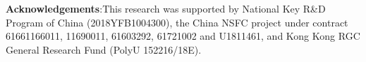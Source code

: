 \documentclass{article}
\begin{document}
\vspace{1mm}
\noindent\textbf{Acknowledgements}:This research was supported by National Key R\&D Program of China (2018YFB1004300), the China NSFC project
under contract 61661166011, 11690011, 61603292, 61721002 and U1811461, and Kong Kong RGC General Research Fund
(PolyU 152216/18E).


\end{document}
